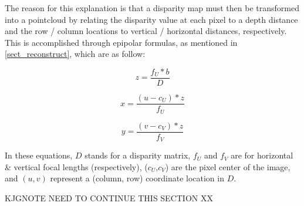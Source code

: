The reason for this explanation is that a disparity map must then be transformed into a pointcloud by relating the disparity value at each pixel to a depth distance and the row / column locations to vertical / horizontal distances, respectively. This is accomplished through epipolar formulas, as mentioned in \ref{sect_reconstruct}, which are as follow:

\begin{equation}
z = \frac{f_U * b}{D}
\end{equation}

\begin{equation}
x = \frac{(u - c_U) * z}{f_U}
\end{equation}

\begin{equation}
y = \frac{(v - c_V) * z}{f_V}
\end{equation}

In these equations, $D$ stands for a disparity matrix, $f_U$ and $f_V$ are for horizontal \& vertical focal lengths (respectively), ($c_U$,$c_V$) are the pixel center of the image, and $(u,v)$ represent a (column, row) coordinate location in $D$.

KJGNOTE NEED TO CONTINUE THIS SECTION XX




